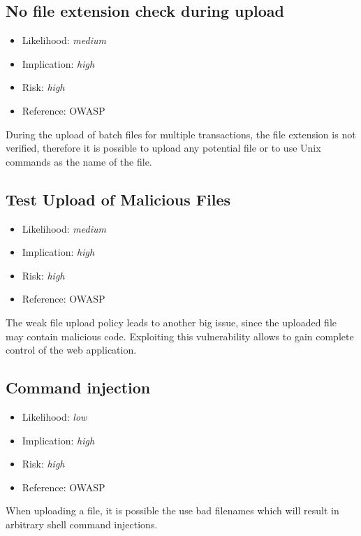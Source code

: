 \subsection{No file extension check during upload} \label{over:extension}
\begin{itemize}
	\item Likelihood: \textit{medium}
	\item Implication: \textit{high}
	\item Risk: \textit{high}
	\item Reference: OWASP 
\end{itemize}
During the upload of batch files for multiple transactions, the file extension is not verified, therefore it is possible to upload any potential file or to use Unix commands as the name of the file.

\subsection{Test Upload of Malicious Files} \label{over:malicious}
\begin{itemize}
	\item Likelihood: \textit{medium}
	\item Implication: \textit{high}
	\item Risk: \textit{high}
	\item Reference: OWASP 
\end{itemize}
The weak file upload policy leads to another big issue, since the uploaded file may contain malicious code. Exploiting this vulnerability allows to gain complete control of the web application.

\subsection{Command injection} \label{over:command}
\begin{itemize}
	\item Likelihood: \textit{low}
	\item Implication: \textit{high}
	\item Risk: \textit{high}
	\item Reference: OWASP 
\end{itemize}
When uploading a file, it is possible the use bad filenames which will result in arbitrary shell command injections.


